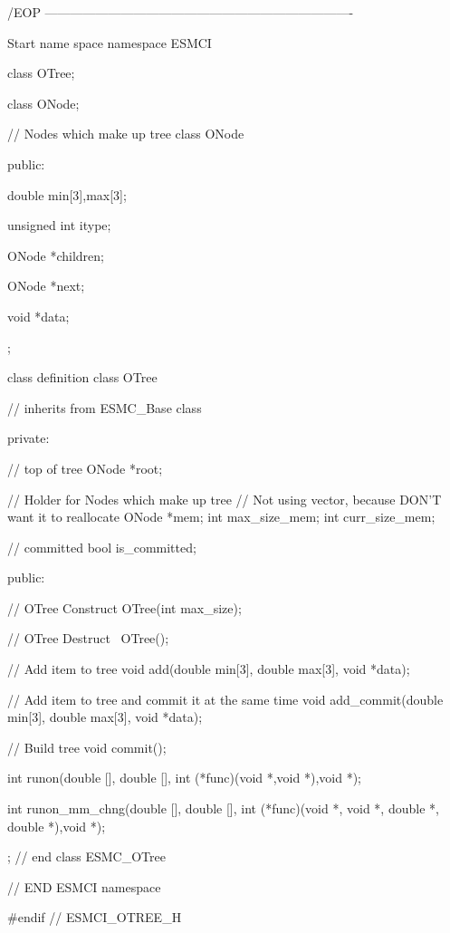  /EOP
  -------------------------------------------------------------------------
 
 
   Start name space
 namespace ESMCI {  
 
 class OTree;
 
 class ONode;
 
   // Nodes which make up tree
   class ONode {
   public:
 
     double min[3],max[3];
 
     unsigned int itype;
 
     ONode *children;
 
     ONode *next;
 
     void *data;
   };
 
 
   class definition
 class OTree {    // inherits from ESMC_Base class
 
  private:
  
   // top of tree
   ONode *root;
 
   // Holder for Nodes which make up tree
   // Not using vector, because DON'T want it to reallocate
   ONode *mem;
   int max_size_mem;
   int curr_size_mem;
 
   // committed
   bool is_committed;
 
  public:
 
   // OTree Construct 
   OTree(int max_size);
 
   // OTree Destruct
   ~OTree();
 
  // Add item to tree
  void add(double min[3], double max[3], void *data);
 
  // Add item to tree and commit it at the same time
  void add_commit(double min[3], double max[3], void *data);
 
  // Build tree
  void commit();
 
  int runon(double [], double [], int (*func)(void *,void *),void *);
 
  int runon_mm_chng(double [], double [],
         int (*func)(void *, void *, double *, double *),void *);
    
 
 
 };  // end class ESMC_OTree
 
  
 } // END ESMCI namespace
 
 #endif  // ESMCI_OTREE_H
 
 
\setlength{\parskip}{\oldparskip}
\setlength{\parindent}{\oldparindent}
\setlength{\baselineskip}{\oldbaselineskip}
